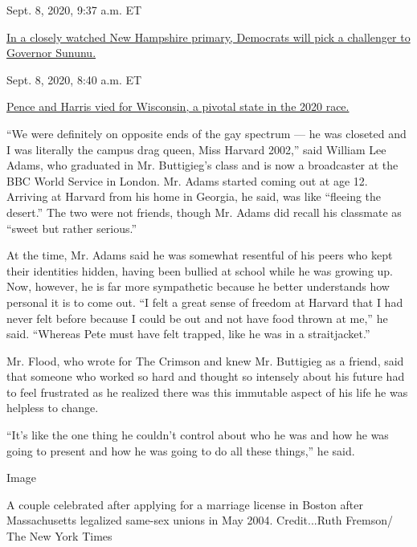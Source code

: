 Sept. 8, 2020, 9:37 a.m. ET

\href{https://www.nytimes3xbfgragh.onion/live/2020/09/08/us/trump-vs-biden\#in-a-closely-watched-new-hampshire-primary-democrats-will-pick-a-challenger-to-governor-sununu}{In
a closely watched New Hampshire primary, Democrats will pick a
challenger to Governor
Sununu.}\href{https://www.nytimes3xbfgragh.onion/live/2020/09/08/us/trump-vs-biden\#pence-and-harris-vied-for-wisconsin-a-pivotal-state-in-the-2020-race}{}

Sept. 8, 2020, 8:40 a.m. ET

\href{https://www.nytimes3xbfgragh.onion/live/2020/09/08/us/trump-vs-biden\#pence-and-harris-vied-for-wisconsin-a-pivotal-state-in-the-2020-race}{Pence
and Harris vied for Wisconsin, a pivotal state in the 2020 race.}

``We were definitely on opposite ends of the gay spectrum --- he was
closeted and I was literally the campus drag queen, Miss Harvard 2002,''
said William Lee Adams, who graduated in Mr. Buttigieg's class and is
now a broadcaster at the BBC World Service in London. Mr. Adams started
coming out at age 12. Arriving at Harvard from his home in Georgia, he
said, was like ``fleeing the desert.'' The two were not friends, though
Mr. Adams did recall his classmate as ``sweet but rather serious.''

At the time, Mr. Adams said he was somewhat resentful of his peers who
kept their identities hidden, having been bullied at school while he was
growing up. Now, however, he is far more sympathetic because he better
understands how personal it is to come out. ``I felt a great sense of
freedom at Harvard that I had never felt before because I could be out
and not have food thrown at me,'' he said. ``Whereas Pete must have felt
trapped, like he was in a straitjacket.''

Mr. Flood, who wrote for The Crimson and knew Mr. Buttigieg as a friend,
said that someone who worked so hard and thought so intensely about his
future had to feel frustrated as he realized there was this immutable
aspect of his life he was helpless to change.

``It's like the one thing he couldn't control about who he was and how
he was going to present and how he was going to do all these things,''
he said.

Image

A couple celebrated after applying for a marriage license in Boston
after Massachusetts legalized same-sex unions in May 2004. Credit...Ruth
Fremson/ The New York Times

